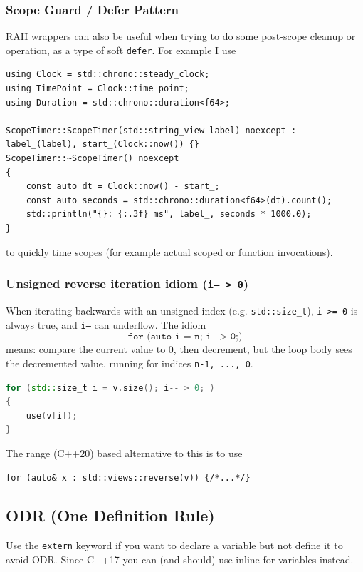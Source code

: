 \documentclass{article}
\begin{document}
\subsubsection{Scope Guard / Defer Pattern}
RAII wrappers can also be useful when trying to do some post-scope cleanup or operation, as a type of soft \texttt{defer}.  For example I use 
\begin{lstlisting}
using Clock = std::chrono::steady_clock;
using TimePoint = Clock::time_point;
using Duration = std::chrono::duration<f64>;

ScopeTimer::ScopeTimer(std::string_view label) noexcept : label_(label), start_(Clock::now()) {}
ScopeTimer::~ScopeTimer() noexcept
{
    const auto dt = Clock::now() - start_;
    const auto seconds = std::chrono::duration<f64>(dt).count();
    std::println("{}: {:.3f} ms", label_, seconds * 1000.0);
}
\end{lstlisting}
to quickly time scopes (for example actual scoped or function invocations).

\subsubsection{Unsigned reverse iteration idiom (\texttt{i-- > 0})}
When iterating backwards with an unsigned index (e.g. \texttt{std::size\_t}),
\texttt{i >= 0} is always true, and \texttt{i--} can underflow.
The idiom
\[
\texttt{for (auto i = n; i-- > 0;)}
\]
means: compare the current value to 0, then decrement, but the loop body sees
the decremented value, running for indices \texttt{n-1, ..., 0}.

\begin{lstlisting}[language=cpp,caption={Reverse loop for unsigned indices (safe)}]
for (std::size_t i = v.size(); i-- > 0; )
{
    use(v[i]);
}
\end{lstlisting}

The range (C++20) based alternative to this is to use
\begin{lstlisting}
for (auto& x : std::views::reverse(v)) {/*...*/}
\end{lstlisting}


\subsection{ODR (One Definition Rule)}
Use the \texttt{extern} keyword if you want to declare a variable but not define it to avoid ODR. Since C++17 you can (and should) use inline for variables instead.
\end{document}
